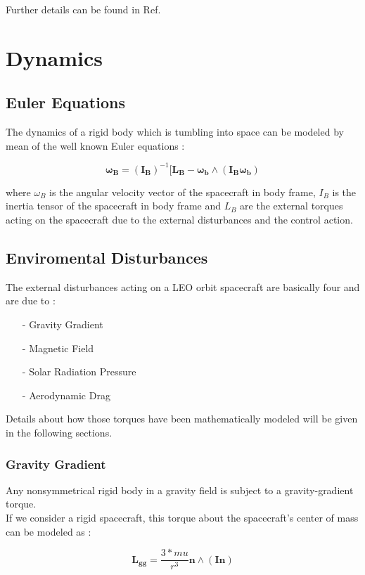 \documentclass[11pt,a4paper]{report}
\begin{document}
Further details can be found in Ref. \cite{notes:bigss}
\section{Dynamics}
\subsection{Euler Equations}
The dynamics of a rigid body which is tumbling into space can be modeled by mean of the well known Euler equations : 

\begin{equation}
  \mathbf{\omega_B} = \mathbf{(I_B)}^{-1} [\mathbf{L_B} - \mathbf{\omega_b}  \wedge (\mathbf{I_B} \mathbf{\omega_b})
\end{equation}

where \textbf{$\omega_B$} is the angular velocity vector of the spacecraft in body frame, \textbf{$I_B$} is the inertia tensor of the spacecraft in body frame and \textbf{$L_B$} are the external torques acting on the spacecraft due to the external disturbances and the control action.

\subsection{Enviromental Disturbances}
The external disturbances acting on a LEO orbit spacecraft are basically four and are due to :

\begin{itemize}
  \item[-] Gravity Gradient
  \item[-] Magnetic Field 
  \item[-] Solar Radiation Pressure
  \item[-] Aerodynamic Drag
\end{itemize}

Details about how those torques have been mathematically modeled will be given in the following sections.

\subsubsection{Gravity Gradient}
Any nonsymmetrical rigid body in a gravity field is subject to a gravity-gradient torque.\\
If we consider a rigid spacecraft, this torque about the spacecraft's center of mass can be modeled as :

\begin{equation}
 \mathbf{L_{gg}} = \frac{3*mu}{r^3} \mathbf{n} \wedge (\mathbf{I} \mathbf{n})
\end{equation}
\end{document}
